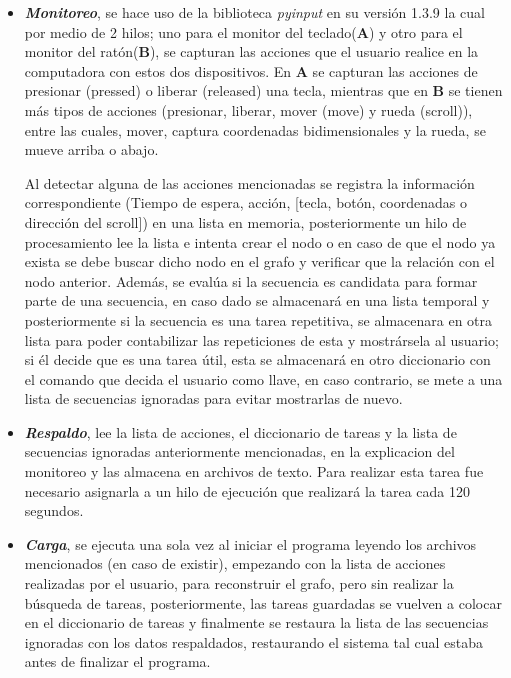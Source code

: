 \begin{itemize}

\item {\textbf{\emph{Monitoreo}}, se hace uso de la biblioteca
 \emph{pyinput} en su versi\'on 1.3.9 la cual por medio de 2 hilos; uno para 
 el monitor del teclado(\textbf{A}) y otro para el monitor del 
 rat\'on(\textbf{B}), se capturan las acciones que el usuario realice en la 
 computadora con estos dos dispositivos. En \textbf{A} se capturan las 
 acciones de presionar (pressed) o liberar (released) una tecla, mientras 
 que en \textbf{B} se tienen m\'as tipos de acciones (presionar, liberar, 
 mover (move) y rueda (scroll)), entre las cuales, mover, captura 
 coordenadas bidimensionales y la rueda, se mueve arriba o abajo. 



Al detectar alguna de las acciones mencionadas se registra la informaci\'on
 correspondiente (Tiempo de espera, acci\'on, [tecla, bot\'on, coordenadas o 
 direcci\'on del scroll]) en una lista en memoria, posteriormente un hilo de 
 procesamiento lee la lista e intenta crear el nodo o en caso de que el nodo 
 ya exista se debe buscar dicho nodo en el grafo y verificar que la
 relaci\'on con el nodo anterior. Adem\'as, se eval\'ua si la secuencia es 
 candidata para formar parte de una secuencia, en caso dado se almacenar\'a 
 en una lista temporal y posteriormente si la secuencia es una tarea 
 repetitiva, se almacenara en otra lista para poder contabilizar las 
 repeticiones de esta y mostr\'arsela al usuario; si \'el decide que es 
 una tarea \'util, esta se almacenar\'a en otro diccionario con el comando
 que decida el usuario como llave, en caso contrario, se mete a una lista de 
 secuencias ignoradas para evitar mostrarlas de nuevo.}

\item { \textbf{\emph{Respaldo}}, lee la lista de acciones, el diccionario
 de tareas y la lista de secuencias ignoradas anteriormente mencionadas, en 
 la explicacion del monitoreo y las almacena en archivos de texto. Para
 realizar esta tarea fue necesario asignarla a un hilo de ejecuci\'on que
 realizar\'a la tarea cada 120 segundos.}


\item{ \textbf{\emph{Carga}}, se ejecuta una sola vez al iniciar el programa 
 leyendo los archivos mencionados (en caso de existir), empezando con la 
 lista de acciones realizadas por el usuario, para reconstruir el grafo, 
 pero sin realizar la b\'usqueda de tareas, posteriormente, las tareas 
 guardadas se vuelven a colocar en el diccionario de tareas y finalmente se 
 restaura la lista de las secuencias ignoradas con los datos respaldados, 
 restaurando el sistema tal cual estaba antes de finalizar el programa.}



\end{itemize}
